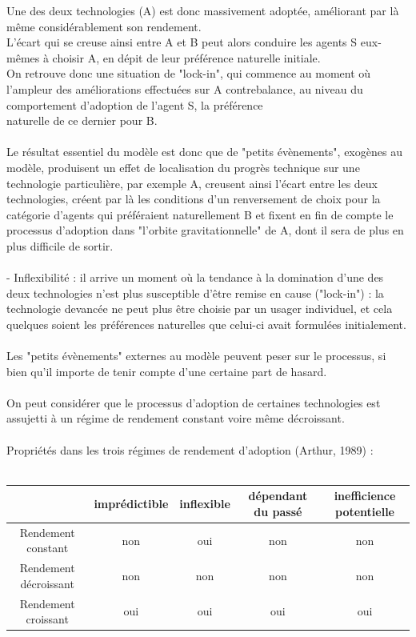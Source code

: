 \documentclass[a4paper, 10pt]{article}
\begin{document}
Une des deux technologies (A) est donc massivement adoptée, améliorant par là même considérablement son rendement.\\
L'écart qui se creuse ainsi entre A et B peut alors conduire les agents S eux-mêmes à choisir A,
en dépit de leur préférence naturelle initiale.\\
On retrouve donc une situation de "lock-in", qui commence au moment où l'ampleur des améliorations effectuées sur A contrebalance,
au niveau du comportement d'adoption de l'agent S, la préférence\\naturelle de ce dernier pour B.\\ \\
Le résultat essentiel du modèle est donc que de "petits évènements", exogènes au modèle,
produisent un effet de localisation du progrès technique sur une technologie particulière, par exemple A,
creusent ainsi l'écart entre les deux technologies,
créent par là les conditions d'un renversement de choix pour la catégorie d'agents qui préféraient naturellement B et
fixent en fin de compte le processus d'adoption dans "l'orbite gravitationnelle" de A, dont il sera de plus en plus difficile de sortir.\\ \\
- Inflexibilité : il arrive un moment où la tendance à la domination d'une des deux technologies
n'est plus susceptible d'être remise en cause ("lock-in") :
la technologie devancée ne peut plus être choisie par un usager individuel,
et cela quelques soient les préférences naturelles que celui-ci avait formulées initialement.\\ \\
Les "petits évènements" externes au modèle peuvent peser sur le processus,
si bien qu'il importe de tenir compte d'une certaine part de hasard.\\ \\
On peut considérer que le processus d'adoption de certaines technologies est assujetti à
un régime de rendement constant voire même décroissant.\\ \\
Propriétés dans les trois régimes de rendement d'adoption (Arthur, 1989) :\\ \\
\begin{tabular}{|c|c|c|c|c|}
\hline
& imprédictible & inflexible & dépendant du passé & inefficience potentielle \\
\hline
Rendement constant & non & oui & non & non\\
\hline
Rendement décroissant & non & non & non & non\\
\hline
Rendement croissant & oui & oui & oui & oui\\
\hline
\end{tabular}\\ \\
\end{document}

